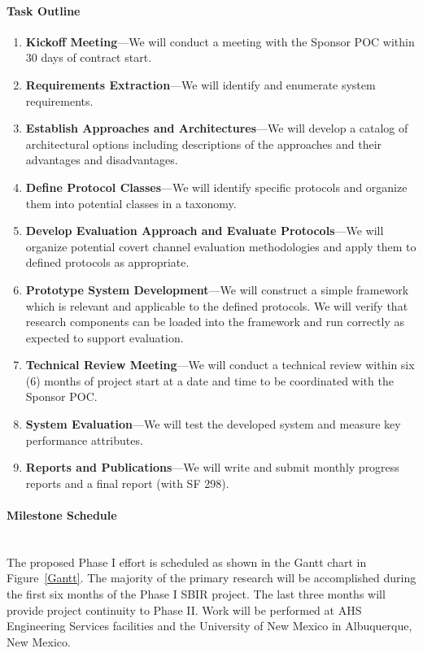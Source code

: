 \documentclass{sbir}
\begin{document}
\paragraph{Task Outline} 
\begin{enumerate}
\vspace{-0.1in}
\item {\bf Kickoff Meeting}---We will conduct a meeting with the Sponsor POC within 30 days of contract start.
\item {\bf Requirements Extraction}---We will identify and enumerate system requirements.
\item {\bf Establish Approaches and Architectures}---We will develop a catalog of architectural options including descriptions of the approaches and their advantages and disadvantages.
\item {\bf Define Protocol Classes}---We will identify specific protocols and organize them into potential classes in a taxonomy.
\item {\bf Develop Evaluation Approach and Evaluate Protocols}---We will organize potential covert channel evaluation methodologies and apply them to defined protocols as appropriate.
\item {\bf Prototype System Development}---We will construct a simple framework which is relevant and applicable to the defined protocols. We will verify that research components can be loaded into the framework and run correctly as expected to support evaluation.
\item {\bf Technical Review Meeting}---We will conduct a technical review within six (6) months of project start at a date and time to be coordinated with the Sponsor POC.
\item {\bf System Evaluation}---We will test the developed system and measure key performance attributes.
\item {\bf Reports and Publications}---We will write and submit monthly progress reports and a final report (with SF 298).
\end{enumerate}

\paragraph{Milestone Schedule}~\\
The proposed Phase I effort is scheduled as shown in the Gantt chart in Figure~\ref{Gantt}. The majority of the primary research will be accomplished during the first six months of the Phase I SBIR project. The last three months will provide project continuity to Phase II. Work will be performed at AHS Engineering Services facilities and the University of New Mexico in Albuquerque, New Mexico.
\end{document}
